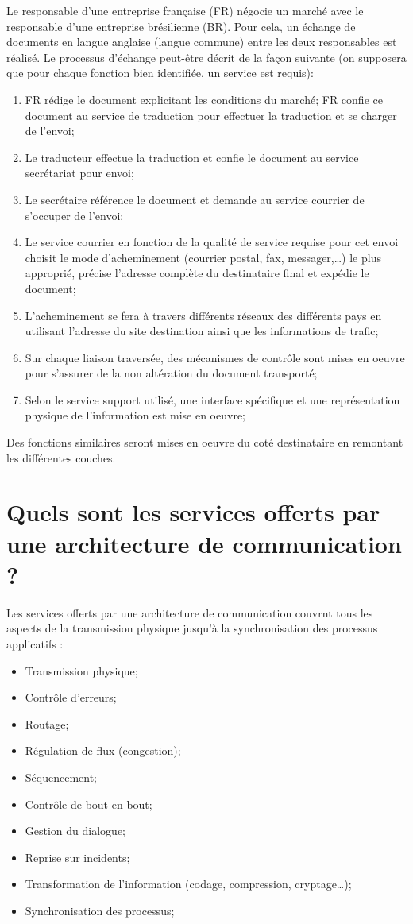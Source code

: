 Le responsable d'une entreprise française (FR) négocie un marché avec le responsable d'une entreprise brésilienne (BR). Pour cela, un échange de documents en langue anglaise (langue commune) entre les deux responsables est réalisé. Le processus d'échange peut-être décrit de la façon suivante (on supposera que pour chaque fonction bien identifiée, un service est requis):
\begin{enumerate}
\item FR rédige le document explicitant les conditions du marché; FR confie ce document au service de traduction pour effectuer la traduction et se charger de l'envoi;
\item Le traducteur effectue la traduction et confie le document au service secrétariat pour envoi;
\item Le secrétaire référence le document et demande au service courrier de s'occuper de l'envoi;
\item Le service courrier en fonction de la qualité de service requise pour cet envoi choisit le mode d'acheminement (courrier postal, fax, messager,\ldots)  le plus approprié, précise l'adresse complète du destinataire final et expédie le document;
\item L'acheminement se fera à travers différents réseaux des différents pays en utilisant l'adresse du site destination ainsi que les informations de trafic;
\item Sur chaque liaison traversée, des mécanismes de contrôle sont mises en oeuvre pour s'assurer de la non altération du document transporté;
\item Selon le service support utilisé, une interface spécifique et une représentation physique de l'information est mise en oeuvre;
\end{enumerate}

Des fonctions similaires seront mises en oeuvre du coté destinataire en remontant les différentes couches.

\section{Quels sont les services offerts par une architecture de communication ?}
Les services offerts par une architecture de communication couvrnt tous les aspects de la transmission physique jusqu'à la synchronisation des processus applicatifs :
\begin{itemize}
\item Transmission physique;
\item Contrôle d'erreurs;
\item Routage;
\item Régulation de flux (congestion);
\item Séquencement;
\item Contrôle de bout en bout;
\item Gestion du dialogue;
\item Reprise sur incidents;
\item Transformation de l'information (codage, compression, cryptage\ldots);
\item Synchronisation des processus;
\end{itemize}

